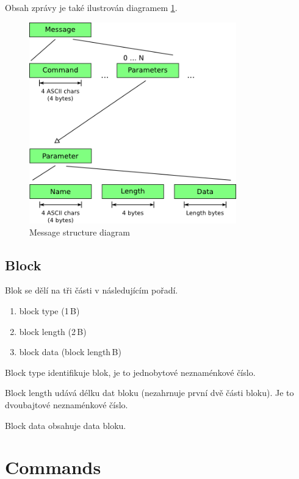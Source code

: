\documentclass[12pt,oneside,a4paper]{report}
\begin{document}
Obsah zprávy je také ilustrován diagramem \ref{picture.message_structure}.

\begin{figure}[h]
  \centering
  \includegraphics[width=0.80\textwidth]{diagrams/message_structure_diagram.png}
  \caption{Message structure diagram}
  \label{picture.message_structure}
\end{figure}

\section{Block}
\label{text.collab_message.block}

Blok se dělí na tři části v následujícím pořadí.

\begin{enumerate}
	\item block type (1\,{}B)
	\item block length (2\,{}B)
	\item block data (block length\,{}B)
\end{enumerate}

Block type identifikuje blok, je to jednobytové neznaménkové číslo.

Block length udává délku dat bloku (nezahrnuje první dvě části bloku). Je to dvoubajtové neznaménkové číslo.

Block data obsahuje data bloku.

\chapter{Commands}
\end{document}
